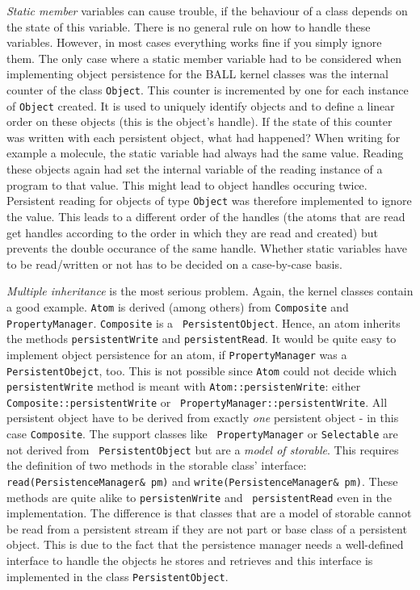 \documentclass[a4]{article}
\begin{document}
{\em Static member} variables can cause trouble, if the behaviour of a class depends
on the state of this variable. There is no general rule on how to handle these
variables. However, in most cases everything works fine if you simply ignore
them. The only case where a static member variable had to be considered when
implementing object persistence for the BALL kernel classes was the internal
counter of the class {\tt Object}. This counter is incremented by one for each
instance of {\tt Object} created. It is used to uniquely identify objects and
to define a linear order on these objects (this is the object's handle).
If the state of this counter was written with each persistent object, what
had happened? When writing for example a molecule, the static variable had
always had the same value. Reading these objects again had set the internal
variable of the reading instance of a program to that value. This might lead
to object handles occuring twice. Persistent reading for objects of type {\tt Object} 
was therefore implemented to ignore the value. This leads to a different order
of the handles (the atoms that are read get handles according to the order in
which they are read and created) but prevents the double occurance of the same
handle. Whether static variables have to be read/written or not has to be
decided  on a case-by-case basis.

{\em Multiple inheritance} is the most serious problem. Again, the kernel
classes contain a good example. {\tt Atom} is derived (among others) from
{\tt Composite} and {\tt PropertyManager}. {\tt Composite} is a {\tt
PersistentObject}. Hence, an atom inherits the methods {\tt persistentWrite}
and {\tt persistentRead}. It would be quite easy to implement object
persistence for an atom, if {\tt PropertyManager} was a {\tt
PersistentObejct}, too. This is not possible since {\tt Atom} could not decide
which {\tt persistentWrite} method is meant with {\tt Atom::persistenWrite}:
either {\tt Composite::persistentWrite} or {\tt
PropertyManager::persistentWrite}. 
All persistent object have to be derived from exactly {\em one} persistent
object - in this case {\tt Composite}. The support classes like {\tt
PropertyManager} or {\tt Selectable} are not derived from {\tt
PersistentObject} but are a {\em model of storable}. 
This requires the definition of two methods in the storable class' interface:
{\tt read(PersistenceManager\& pm)} and {\tt write(PersistenceManager\& pm)}.
These methods are quite alike to {\tt persistenWrite} and {\tt
persistentRead} even in the implementation. The difference is that classes
that are a model of storable cannot be read from a persistent stream if they
are not part or base class of a persistent object. This is due to the fact
that the persistence manager needs a well-defined interface to handle the
objects he stores and retrieves and this interface is implemented in the class
{\tt PersistentObject}. 
\end{document}
